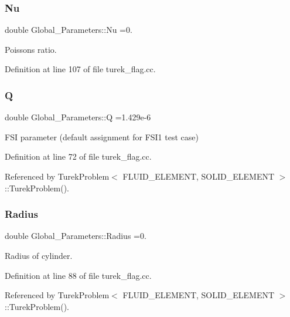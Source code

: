\subsubsection{\texorpdfstring{Nu}{Nu}}
{\footnotesize\ttfamily double Global\+\_\+\+Parameters\+::\+Nu =0.}



Poisson\textquotesingle{}s ratio. 



Definition at line 107 of file turek\+\_\+flag.\+cc.

\mbox{\label{namespaceGlobal__Parameters_a7814fddf663e56168174a42d2cd6b4c1}} 
\subsubsection{\texorpdfstring{Q}{Q}}
{\footnotesize\ttfamily double Global\+\_\+\+Parameters\+::Q =1.\+429e-\/6}



F\+SI parameter (default assignment for F\+S\+I1 test case) 



Definition at line 72 of file turek\+\_\+flag.\+cc.



Referenced by Turek\+Problem$<$ F\+L\+U\+I\+D\+\_\+\+E\+L\+E\+M\+E\+N\+T, S\+O\+L\+I\+D\+\_\+\+E\+L\+E\+M\+E\+N\+T $>$\+::\+Turek\+Problem().

\mbox{\label{namespaceGlobal__Parameters_a126c1e491ef187867b6b7bfb52b476ad}} 
\subsubsection{\texorpdfstring{Radius}{Radius}}
{\footnotesize\ttfamily double Global\+\_\+\+Parameters\+::\+Radius =0.}



Radius of cylinder. 



Definition at line 88 of file turek\+\_\+flag.\+cc.



Referenced by Turek\+Problem$<$ F\+L\+U\+I\+D\+\_\+\+E\+L\+E\+M\+E\+N\+T, S\+O\+L\+I\+D\+\_\+\+E\+L\+E\+M\+E\+N\+T $>$\+::\+Turek\+Problem().

